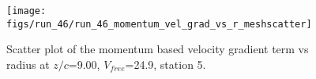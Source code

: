 \begin{figure}[H]
\centering
\texttt{[image: figs/run\_46/run\_46\_momentum\_vel\_grad\_vs\_r\_meshscatter]}
\caption{Scatter plot of the momentum based velocity gradient term vs radius at $z/c$=9.00, $V_{free}$=24.9, station 5.}
\label{fig:run_46_momentum_vel_grad_vs_r_meshscatter}
\end{figure}


